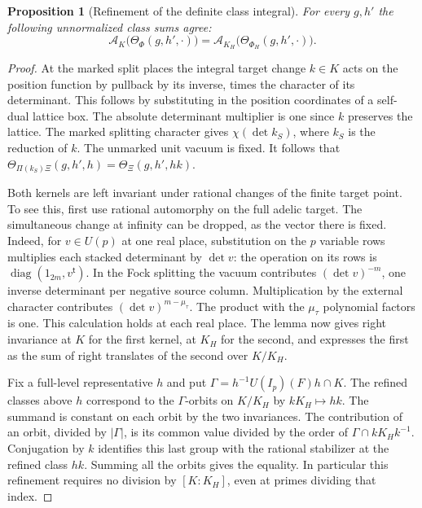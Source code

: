 \documentclass[a4paper,11pt]{article}
\newtheorem{proposition}{Proposition}[section]
\theoremstyle{definition}
\theoremstyle{remark}
\numberwithin{equation}{section}
\begin{document}
\begin{proposition}[Refinement of the definite class integral]
\leavevmode\label{prop:refinedmass824}
For every \(g,h'\) the following unnormalized class sums agree:
\[
 \mathcal A_K\bigl(\Theta_{\Phi}(g,h',\cdot)\bigr)
     =\mathcal A_{K_H}\bigl(\Theta_{\Phi_H}(g,h',\cdot)\bigr).
\]
\end{proposition}
\begin{proof}
At the marked split places the integral target change \(k\in K\)
acts on the position function by pullback by its inverse, times
the character of its determinant. This follows by substituting
in the position coordinates of a self-dual lattice box. The
absolute determinant multiplier is one since \(k\) preserves
the lattice. The marked splitting character gives
\(\chi(\det k_S)\), where \(k_S\) is the reduction of \(k\).
The unmarked unit vacuum is fixed. It follows that
\(\Theta_{\Pi(k_S)\Xi}(g,h',h)=\Theta_\Xi(g,h',hk)\).

Both kernels are left invariant under rational changes of the
finite target point. To see this, first use rational automorphy
on the full adelic target. The simultaneous change at infinity
can be dropped, as the vector there is fixed. Indeed, for
\(v\in U(p)\) at one real place, substitution on the \(p\)
variable rows multiplies each stacked determinant by \(\det v\):
the operation on its rows is \(\operatorname{diag}(1_{2m},v^{\mathsf t})\).
In the Fock splitting the vacuum contributes
\((\det v)^{-m}\), one inverse determinant per negative source
column. Multiplication by the external character contributes
\((\det v)^{m-\mu_\tau}\). The product with the \(\mu_\tau\)
polynomial factors is one. This calculation holds at each real
place. The lemma now gives right invariance at \(K\) for the
first kernel, at \(K_H\) for the second, and expresses the
first as the sum of right translates of the second over \(K/K_H\).

Fix a full-level representative \(h\) and put
\(\Gamma=h^{-1}U(I_p)(F)h\cap K\). The refined classes above
\(h\) correspond to the \(\Gamma\)-orbits on \(K/K_H\) by
\(kK_H\mapsto hk\). The summand is constant on each orbit
by the two invariances. The contribution of an orbit, divided
by \(|\Gamma|\), is its common value divided by the order of
\(\Gamma\cap kK_H k^{-1}\). Conjugation by \(k\) identifies
this last group with the rational stabilizer at the refined
class \(hk\). Summing all the orbits gives the equality. In
particular this refinement requires no division by \([K:K_H]\),
even at primes dividing that index.
\end{proof}
\end{document}
